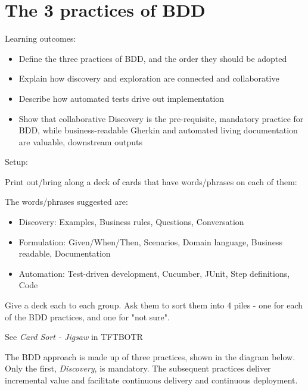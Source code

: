 \chapter*{The 3 practices of BDD}


\ifnotes
    Learning outcomes:
    
    \begin{itemize}
        \item Define the three practices of BDD, and the order they should be adopted
        \item Explain how discovery and exploration are connected and collaborative 
        \item Describe how automated tests drive out implementation
        \item Show that collaborative Discovery is the pre-requisite, mandatory practice for BDD, while business-readable Gherkin and automated living documentation are valuable, downstream outputs
    \end{itemize}
    
   Setup:
   
   Print out/bring along a deck of cards that have words/phrases on each of them:
   
   The words/phrases suggested are:
   
    \begin{itemize}
        \item Discovery: Examples, Business rules, Questions, Conversation
       \item Formulation: Given/When/Then, Scenarios, Domain language, Business readable, Documentation
       \item Automation: Test-driven development, Cucumber, JUnit, Step definitions, Code
    \end{itemize}
   
   Give a deck each to each group. Ask them to sort them into 4 piles - one for each of the BDD practices, and one for "not sure".
   
   See \emph{Card Sort - Jigsaw} in TFTBOTR
\fi

\ifcontent
    The BDD approach is made up of three practices, shown in the diagram below. Only the first, \emph{Discovery}, is mandatory. The subsequent practices deliver incremental value and facilitate continuous delivery and continuous deployment.
    
